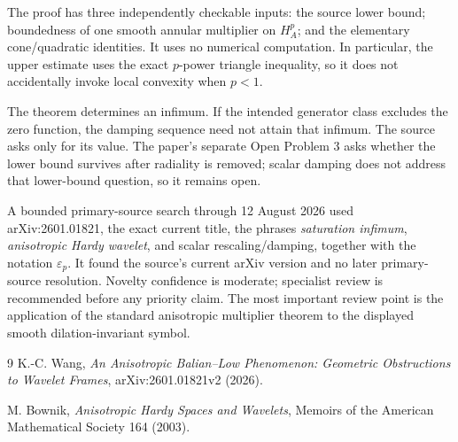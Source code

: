\documentclass[11pt]{article}
\theoremstyle{remark}
\newcommand{\eps}{\varepsilon}
\begin{document}
The proof has three independently checkable inputs: the source lower bound;
boundedness of one smooth annular multiplier on \(H_A^p\); and the elementary
cone/quadratic identities. It uses no numerical computation. In particular,
the upper estimate uses the exact \(p\)-power triangle inequality, so it does
not accidentally invoke local convexity when \(p<1\).

The theorem determines an infimum. If the intended generator class excludes
the zero function, the damping sequence need not attain that infimum. The
source asks only for its value. The paper's separate Open Problem 3 asks
whether the lower bound survives after radiality is removed; scalar damping
does not address that lower-bound question, so it remains open.

A bounded primary-source search through 12 August 2026 used arXiv:2601.01821,
the exact current title, the phrases \emph{saturation infimum},
\emph{anisotropic Hardy wavelet}, and scalar rescaling/damping, together with
the notation \(\eps_p\). It found the source's current arXiv version and no
later primary-source resolution. Novelty confidence is moderate; specialist
review is recommended before any priority claim. The most important review
point is the application of the standard anisotropic multiplier theorem to
the displayed smooth dilation-invariant symbol.

\begin{thebibliography}{9}
K.-C. Wang,
\emph{An Anisotropic Balian--Low Phenomenon: Geometric Obstructions to
Wavelet Frames}, arXiv:2601.01821v2 (2026).

M. Bownik,
\emph{Anisotropic Hardy Spaces and Wavelets},
Memoirs of the American Mathematical Society 164 (2003).
\end{thebibliography}
\end{document}
